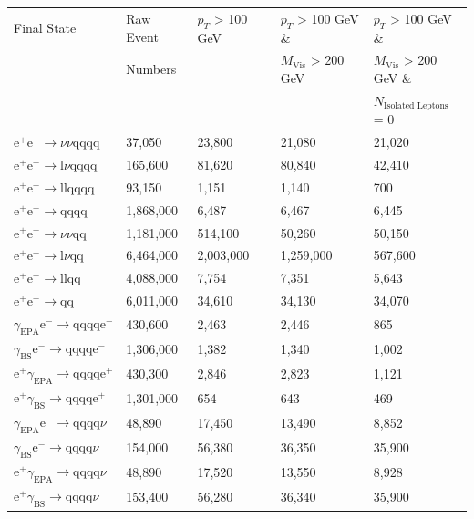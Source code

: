 \begin{table}[h!]
\centering
\begin{tabular}{ l l l l l}
\hline
Final State & Raw Event  & $p_{T}$ > 100 GeV & $p_{T}$ > 100 GeV \& & $p_{T}$ > 100 GeV \& \\ 
& Numbers & & $M_{\text{Vis}}$ > 200 GeV & $M_{\text{Vis}}$ > 200 GeV \&\\ 
& & & & $N_{\text{Isolated Leptons}}$ = 0\\ 
\hline
$\text{e}^{+}\text{e}^{-} \rightarrow \nu{\nu}\text{qqqq}$ & 37,050 & 23,800 & 21,080 & 21,020\\
$\text{e}^{+}\text{e}^{-} \rightarrow \text{l}\nu\text{qqqq}$ & 165,600 & 81,620 & 80,840 & 42,410\\
$\text{e}^{+}\text{e}^{-} \rightarrow \text{llqqqq}$ & 93,150 & 1,151 & 1,140 & 700\\
$\text{e}^{+}\text{e}^{-} \rightarrow \text{qqqq}$ & 1,868,000 & 6,487 & 6,467 & 6,445\\
$\text{e}^{+}\text{e}^{-} \rightarrow \nu{\nu}\text{qq}$ & 1,181,000 & 514,100 & 50,260 & 50,150\\
$\text{e}^{+}\text{e}^{-} \rightarrow \text{l}\nu\text{qq}$ & 6,464,000 & 2,003,000 & 1,259,000 & 567,600\\
$\text{e}^{+}\text{e}^{-} \rightarrow \text{llqq}$ & 4,088,000 & 7,754 & 7,351 & 5,643\\
$\text{e}^{+}\text{e}^{-} \rightarrow \text{qq}$ & 6,011,000 & 34,610 & 34,130 & 34,070\\
$\gamma_{\text{EPA}}\text{e}^{-} \rightarrow \text{qqqq}\text{e}^{-}$ & 430,600 & 2,463 & 2,446 & 865\\
$\gamma_{\text{BS}}\text{e}^{-} \rightarrow \text{qqqq}\text{e}^{-}$ & 1,306,000 & 1,382 & 1,340 & 1,002\\
$\text{e}^{+}\gamma_{\text{EPA}} \rightarrow \text{qqqq}\text{e}^{+}$ & 430,300 & 2,846 & 2,823 & 1,121\\
$\text{e}^{+}\gamma_{\text{BS}} \rightarrow \text{qqqq}\text{e}^{+}$ & 1,301,000 & 654 & 643 & 469\\
$\gamma_{\text{EPA}}\text{e}^{-} \rightarrow \text{qqqq}\nu$ & 48,890 & 17,450 & 13,490 & 8,852\\
$\gamma_{\text{BS}}\text{e}^{-} \rightarrow \text{qqqq}\nu$ & 154,000 & 56,380 & 36,350 & 35,900\\
$\text{e}^{+}\gamma_{\text{EPA}} \rightarrow \text{qqqq}\nu$ & 48,890 & 17,520 & 13,550 & 8,928\\
$\text{e}^{+}\gamma_{\text{BS}} \rightarrow \text{qqqq}\nu$ & 153,400 & 56,280 & 36,340 & 35,900\\

\end{tabular}
\end{table}
